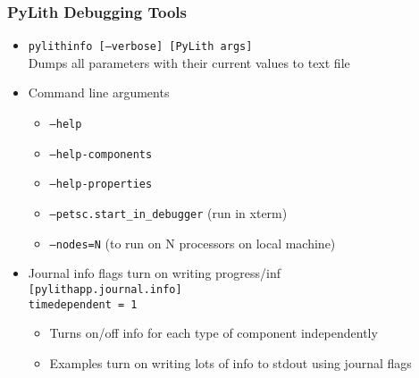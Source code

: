 \documentclass{beamer}
\begin{document}
\begin{frame}
  \frametitle{PyLith Debugging Tools}
  \summary{}

  \begin{itemize}
  \item {\tt pylithinfo [--verbose] [PyLith args]}\\
    Dumps all parameters with their current values to text file
  \item Command line arguments
    \begin{itemize}
    \item {\tt --help}
    \item {\tt --help-components}
    \item {\tt --help-properties}
    \item {\tt --petsc.start\_in\_debugger} (run in xterm)
    \item {\tt --nodes=N} (to run on N processors on local machine)
    \end{itemize}
  \item Journal info flags turn on writing progress/inf\\
    {\tt [pylithapp.journal.info]}\\
    {\tt timedependent = 1} \\
    \begin{itemize}
    \item Turns on/off info for each type of component independently
    \item Examples turn on writing lots of info to stdout using journal flags
    \end{itemize}
  \end{itemize}

\end{frame}




\end{document}
